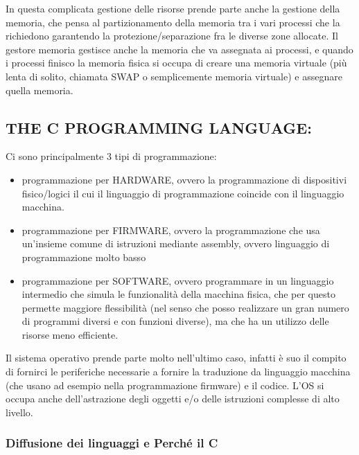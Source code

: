 \documentclass[
  paper=a4,
  oneside  ,captions=tableheading
]{scrbook}
\providecommand{\tightlist}{%
  \setlength{\itemsep}{0pt}\setlength{\parskip}{0pt}}
\begin{document}
In questa complicata gestione delle risorse prende parte anche la
gestione della memoria, che pensa al partizionamento della memoria tra i
vari processi che la richiedono garantendo la protezione/separazione fra
le diverse zone allocate. Il gestore memoria gestisce anche la memoria
che va assegnata ai processi, e quando i processi finisco la memoria
fisica si occupa di creare una memoria virtuale (più lenta di solito,
chiamata SWAP o semplicemente memoria virtuale) e assegnare quella
memoria.

\hypertarget{the-c-programming-language}{%
\subsection{THE C PROGRAMMING
LANGUAGE:}\label{the-c-programming-language}}

Ci sono principalmente 3 tipi di programmazione:

\begin{itemize}
\tightlist
\item
  programmazione per HARDWARE, ovvero la programmazione di dispositivi
  fisico/logici il cui il linguaggio di programmazione coincide con il
  linguaggio macchina.
\item
  programmazione per FIRMWARE, ovvero la programmazione che usa
  un'insieme comune di istruzioni mediante assembly, ovvero linguaggio
  di programmazione molto basso
\item
  programmazione per SOFTWARE, ovvero programmare in un linguaggio
  intermedio che simula le funzionalità della macchina fisica, che per
  questo permette maggiore flessibilità (nel senso che posso realizzare
  un gran numero di programmi diversi e con funzioni diverse), ma che ha
  un utilizzo delle risorse meno efficiente.
\end{itemize}

Il sistema operativo prende parte molto nell'ultimo caso, infatti è suo
il compito di fornirci le periferiche necessarie a fornire la traduzione
da linguaggio macchina (che usano ad esempio nella programmazione
firmware) e il codice. L'OS si occupa anche dell'astrazione degli
oggetti e/o delle istruzioni complesse di alto livello.

\hypertarget{diffusione-dei-linguaggi-e-perchuxe9-il-c}{%
\subsubsection{Diffusione dei linguaggi e Perché il
C}\label{diffusione-dei-linguaggi-e-perchuxe9-il-c}}
\end{document}
